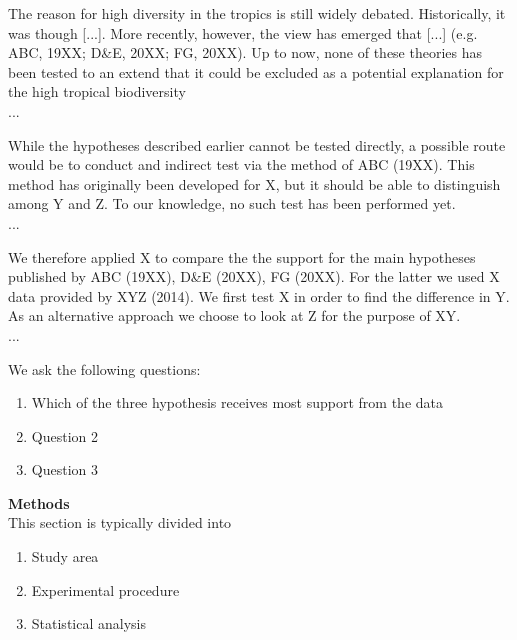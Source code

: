 \documentclass{tufte-book}
\begin{document}
The reason for high diversity in the tropics is still widely debated. Historically, it was though [...]. More recently, however, the view has emerged that [...] (e.g. ABC, 19XX; D\&E, 20XX; FG, 20XX). Up to now, none of these theories has been tested to an extend that it could be excluded as a potential explanation for the high tropical biodiversity\\
...

While the hypotheses described earlier cannot be tested directly, a possible route would be to conduct and indirect test via the method of ABC (19XX). This method has originally been developed for X, but it should be able to distinguish among Y and Z. To our knowledge, no such test has been performed yet.
\\
...

We therefore applied X to compare the the support for the main hypotheses published by ABC (19XX), D\&E (20XX), FG (20XX). For the latter we used X data provided by XYZ (2014). We first test X in order to find the difference in Y. As an alternative approach we choose to look at Z for the purpose of XY.\\
... 

We ask the following questions:


\begin{enumerate}
\item Which of the three hypothesis receives most support from the data
\item Question 2
\item Question 3
\end{enumerate}

\noindent\textbf{Methods}\\

This section is typically divided into

\begin{enumerate}
\item Study area
\item Experimental procedure
\item Statistical analysis
\end{enumerate}
\end{document}
